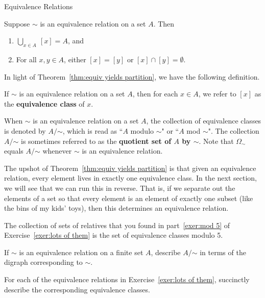 \begin{section}{Equivalence Relations}
\begin{theorem}\label{thm:equiv yields partition}
Suppose $\sim$ is an equivalence relation on a set $A$.  Then
\begin{enumerate}[label=\textrm{(\alph*)}]
\item $\displaystyle \bigcup_{x\in A}\ [x]=A$, and
\item For all $x,y\in A$, either $[x]=[y]$ or $[x]\cap [y]=\emptyset$.
\end{enumerate}
\end{theorem}

In light of Theorem~\ref{thm:equiv yields partition}, we have the following definition.

\begin{definition}\label{def:equivalence class}
If $\sim$ is an equivalence relation on a set $A$, then for each $x\in A$, we refer to $[x]$ as the \textbf{equivalence class} of $x$.
\end{definition}

When $\sim$ is an equivalence relation on a set $A$, the collection of equivalence classes is denoted by $A/\mathord\sim$, which is read as ``$A$ modulo $\sim$" or ``$A$ mod $\sim$".  The collection $A/\mathord\sim$ is sometimes referred to as the \textbf{quotient set of $A$ by $\sim$}. Note that $\Omega_{\sim}$ equals $A/\mathord\sim$ whenever $\sim$ is an equivalence relation.

The upshot of Theorem~\ref{thm:equiv yields partition} is that given an equivalence relation, every element lives in exactly one equivalence class.  In the next section, we will see that we can run this in reverse.  That is, if we separate out the elements of a set so that every element is an element of exactly one subset (like the bins of my kids' toys), then this determines an equivalence relation.

\begin{example}
The collection of sets of relatives that you found in part~\ref{exer:mod 5} of Exercise~\ref{exer:lots of them} is the set of equivalence classes modulo 5.
\end{example}

\begin{exercise}
If $\sim$ is an equivalence relation on a finite set $A$, describe $A/\mathord\sim$ in terms of the digraph corresponding to $\sim$.
\end{exercise}

\begin{exercise}
For each of the equivalence relations in Exercise~\ref{exer:lots of them}, succinctly describe the corresponding equivalence classes.
\end{exercise}

\end{section}